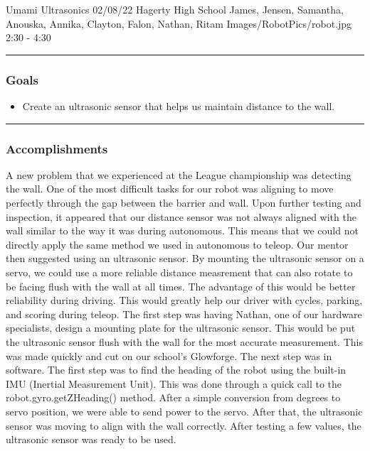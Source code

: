 \insertmeeting 
	{Umami Ultrasonics} 
	{02/08/22} 
	{Hagerty High School}
	{James, Jensen, Samantha, Anouska, Annika, Clayton, Falon, Nathan, Ritam}
	{Images/RobotPics/robot.jpg}
	{2:30 - 4:30}
	
\noindent\hfil\rule{\textwidth}{.4pt}\hfil
\subsubsection*{Goals}
\begin{itemize}
    \item Create an ultrasonic sensor that helps us maintain distance to the wall. 

\end{itemize} 

\noindent\hfil\rule{\textwidth}{.4pt}\hfil

\subsubsection*{Accomplishments}
A new problem that we experienced at the League championship was detecting the wall. One of the most difficult tasks for our robot was aligning to move perfectly through the gap between the barrier and wall. Upon further testing and inspection, it appeared that our distance sensor was not always aligned with the wall similar to the way it was during autonomous. This means that we could not directly apply the same method we used in autonomous to teleop. Our mentor then suggested using an ultrasonic sensor. By mounting the ultrasonic sensor on a servo, we could use a more reliable distance measrement that can also rotate to be facing flush with the wall at all times. The advantage of this would be better reliability during driving. This would greatly help our driver with cycles, parking, and scoring during teleop. 
The first step was having Nathan, one of our hardware specialists, design a mounting plate for the ultrasonic sensor. This would be put the ultrasonic sensor flush with the wall for the most accurate measurement. This was made quickly and cut on our school's Glowforge. 
The next step was in software. The first step was to find the heading of the robot using the built-in IMU (Inertial Measurement Unit). This was done through a quick call to the robot.gyro.getZHeading() method. After a simple conversion from degrees to servo position, we were able to send power to the servo. After that, the ultrasonic sensor was moving to align with the wall correctly. After testing a few values, the ultrasonic sensor was ready to be used. 

